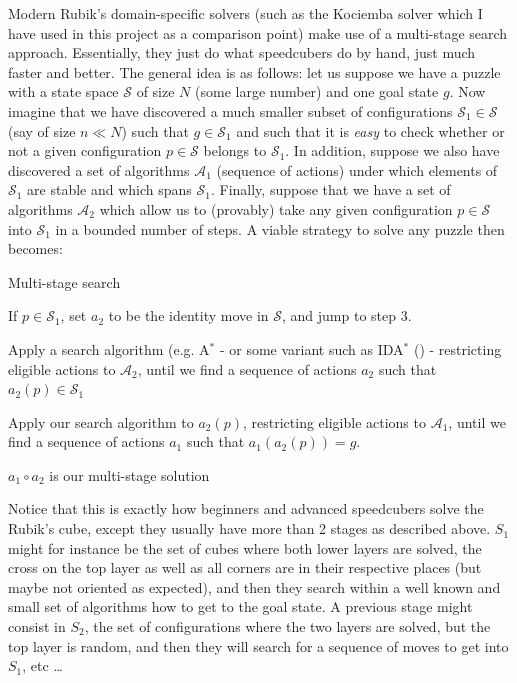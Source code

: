 \label{Theory:RCMSS}
Modern Rubik's domain-specific solvers (such as the Kociemba solver which I have used in this project as a comparison point) make use of a multi-stage search approach. Essentially, they just do what speedcubers do by hand, just much faster and better. The general idea is as follows: let us suppose we have a puzzle with a state space $\mathcal{S}$ of size $N$ (some large number) and one goal state $g$. Now imagine that we have discovered a much smaller subset of configurations $\mathcal{S}_{1} \in \mathcal{S}$ (say of size $n \ll N$) such that $g \in \mathcal{S}_{1}$ and such that it is \textit{easy} to check whether or not a given configuration $p \in \mathcal{S}$ belongs to $\mathcal{S}_{1}$. In addition, suppose we also have discovered a set of algorithms $\mathcal{A}_{1}$ (sequence of actions) under which elements of $\mathcal{S}_{1}$ are stable and which spans $\mathcal{S}_{1}$. Finally, suppose that we have a set of algorithms $\mathcal{A}_{2}$ which allow us to (provably) take any given configuration $p \in \mathcal{S}$ into $\mathcal{S}_{1}$ in a bounded number of steps. A viable strategy to solve any puzzle then becomes:
\begin{titlemize}{Multi-stage search}
\item If $p \in \mathcal{S}_{1}$, set $a_{2}$ to be the identity move in $\mathcal{S}$, and jump to step 3.
\item Apply a search algorithm (e.g. A$^{*}$ - or some variant such as IDA$^{*}$ (\cite{IDAWiki}) - restricting eligible actions to $\mathcal{A}_{2}$, until we find a sequence of actions $a_{2}$ such that $a_{2}(p) \in \mathcal{S}_{1}$
\item Apply our search algorithm to $a_{2}(p)$, restricting eligible actions to $\mathcal{A}_{1}$, until we find a sequence of actions $a_{1}$ such that $a_{1}(a_{2}(p)) = g$.
\item $a_{1} \circ a_{2}$ is our multi-stage solution
\end{titlemize}
Notice that this is exactly how beginners and advanced speedcubers solve the Rubik's cube, except they usually have more than 2 stages as described above. $S_{1}$ might for instance be the set of cubes where both lower layers are solved, the cross on the top layer as well as all corners are in their respective places (but maybe not oriented as expected), and then they search within a well known and small set of algorithms how to get to the goal state. A previous stage might consist in $S_{2}$, the set of configurations where the two layers are solved, but the top layer is random, and then they will search for a sequence of moves to get into $S_{1}$, etc \dots


